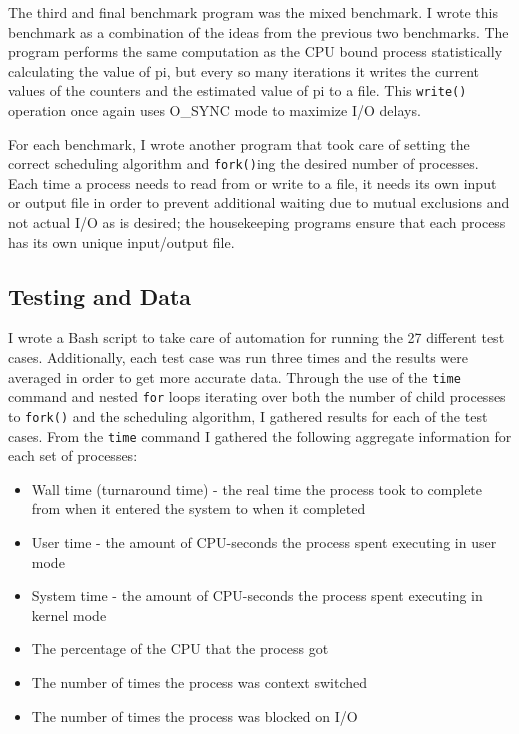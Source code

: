 The third and final benchmark program was the mixed benchmark.  I wrote this benchmark as a combination of the ideas from the previous two benchmarks.  The program performs the same computation as the CPU bound process statistically calculating the value of pi, but every so many iterations it writes the current values of the counters and the estimated value of pi to a file.  This \texttt{write()} operation once again uses O\_SYNC mode to maximize I/O delays.

For each benchmark, I wrote another program that took care of setting the correct scheduling algorithm and \texttt{fork()}ing the desired number of processes.  Each time a process needs to read from or write to a file, it needs its own input or output file in order to prevent additional waiting due to mutual exclusions and not actual I/O as is desired; the housekeeping programs ensure that each process has its own unique input/output file.

\subsection{Testing and Data}

I wrote a Bash script to take care of automation for running the 27 different test cases.  Additionally, each test case was run three times and the results were averaged in order to get more accurate data.  Through the use of the \texttt{time} command and nested \texttt{for} loops iterating over both the number of child processes to \texttt{fork()} and the scheduling algorithm, I gathered results for each of the test cases.  From the \texttt{time} command I gathered the following aggregate information for each set of processes:
\begin{itemize}
  \item Wall time (turnaround time) - the real time the process took to complete from when it entered the system to when it completed
  \item User time - the amount of CPU-seconds the process spent executing in user mode
  \item System time - the amount of CPU-seconds the process spent executing in kernel mode
  \item The percentage of the CPU that the process got
  \item The number of times the process was context switched
  \item The number of times the process was blocked on I/O
\end{itemize}

